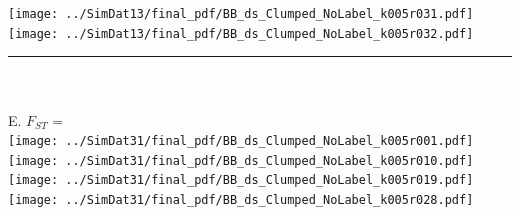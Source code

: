 \documentclass[varwidth=true, border={80, 10}]{standalone}
\newlength{\nameraise}
\newlength{\nameoverhang}
\begin{document}
\texttt{[image: ../SimDat13/final\_pdf/BB\_ds\_Clumped\_NoLabel\_k005r031.pdf]}~\hspace*{-\nameoverhang}\raisebox{\nameraise}{FLOCKTURE (1/9)} \\
\texttt{[image: ../SimDat13/final\_pdf/BB\_ds\_Clumped\_NoLabel\_k005r032.pdf]}~\hspace*{-\nameoverhang}\raisebox{\nameraise}{FLOCKTURE (1/9)} \\
\noindent\rule[.5cm]{8.2in}{0.4pt}\\
\vspace{-2.5em}\\
E. $F_{ST}$ = \\
\texttt{[image: ../SimDat31/final\_pdf/BB\_ds\_Clumped\_NoLabel\_k005r001.pdf]}~\hspace*{-\nameoverhang}\raisebox{\nameraise}{STRUCTURE A.C (9/9)} \\
\texttt{[image: ../SimDat31/final\_pdf/BB\_ds\_Clumped\_NoLabel\_k005r010.pdf]}~\hspace*{-\nameoverhang}\raisebox{\nameraise}{STRUCTURE NA.C (9/9)} \\
\texttt{[image: ../SimDat31/final\_pdf/BB\_ds\_Clumped\_NoLabel\_k005r019.pdf]}~\hspace*{-\nameoverhang}\raisebox{\nameraise}{STRUCTURE NA.NC  (9/9)} \\
\texttt{[image: ../SimDat31/final\_pdf/BB\_ds\_Clumped\_NoLabel\_k005r028.pdf]}~\hspace*{-\nameoverhang}\raisebox{\nameraise}{FLOCKTURE (1/9)*} \\
\end{document}
